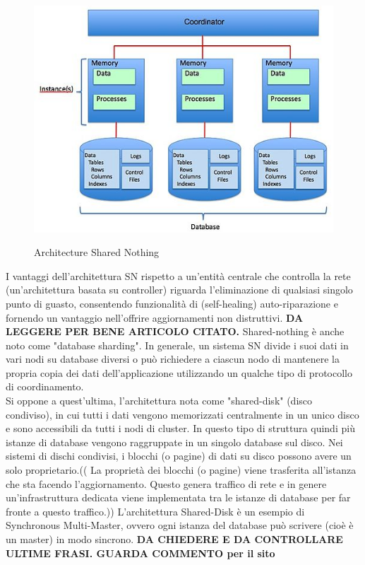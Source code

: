 \begin{figure}[htbp]
\centering
\includegraphics[scale=0.70]{img/Shared_Nothing_Architecture.jpg}\\
\caption{Architecture Shared Nothing \label{figura1.1} \cite{etichetta7}}
\end{figure}

I vantaggi dell'architettura SN rispetto a un'entit\`{a} centrale che controlla la rete (un'architettura basata su controller) riguarda l'eliminazione di qualsiasi singolo punto di guasto, consentendo funzionalit\`{a} di (self-healing) auto-riparazione e fornendo un vantaggio nell'offrire aggiornamenti non distruttivi.\cite{etichetta6} 
\textbf{DA LEGGERE PER BENE ARTICOLO CITATO.}
Shared-nothing \`{e} anche noto come "database sharding". In generale, un sistema SN divide i suoi dati in vari nodi su database diversi o pu\`{o} richiedere a ciascun nodo di mantenere la propria copia dei dati dell'applicazione utilizzando un qualche tipo di protocollo di coordinamento.\cite{etichetta5}\\
Si oppone a quest'ultima, l'architettura nota come "shared-disk" (disco condiviso), in cui tutti i dati vengono memorizzati centralmente in un unico disco e sono accessibili da tutti i nodi di cluster.\cite{etichetta7} In questo tipo di struttura quindi pi\`{u} istanze di database vengono raggruppate in un singolo database sul disco. Nei sistemi di dischi condivisi, i blocchi (o pagine) di dati su disco possono avere un solo proprietario.((
La proprietà dei blocchi (o pagine) viene trasferita all'istanza che sta facendo l'aggiornamento. Questo genera traffico di rete e in genere un'infrastruttura dedicata viene implementata tra le istanze di database per far fronte a questo traffico.))
L'architettura Shared-Disk \`{e} un esempio di Synchronous Multi-Master, ovvero ogni istanza del database pu\`{o} scrivere (cio\`{e} \`{e} un master) in modo sincrono.\cite{etichetta7}
\textbf{DA CHIEDERE E DA CONTROLLARE ULTIME FRASI. GUARDA COMMENTO per il sito}

